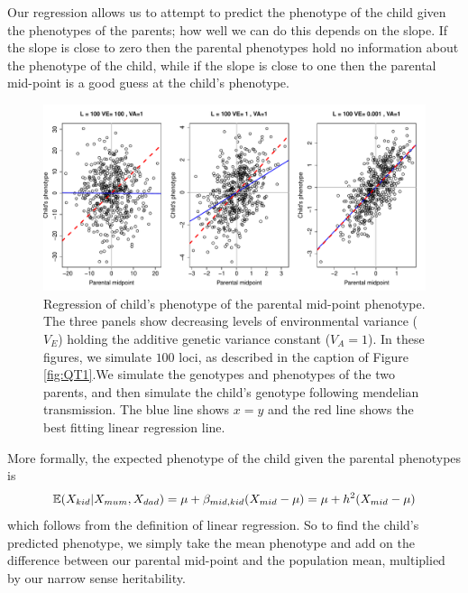 Our regression allows us to attempt to predict the phenotype of the
child given the phenotypes of the parents; how well we can do this depends on the
slope. If the slope is close to zero then the parental phenotypes hold no
information about the phenotype of the child, while if the slope is
close to one then the parental mid-point is a good guess at the child's
phenotype.\\
\begin{figure}
\begin{center}
\includegraphics[width=\textwidth]{figures/QT2.pdf}
\end{center}
\caption{Regression of child's phenotype of the parental mid-point phenotype. The three panels show decreasing levels of environmental
  variance ($V_E$) holding the additive genetic variance constant ($V_A=1$). 
 In these figures, we simulate $100$ loci, as described in
 the caption of Figure \ref{fig:QT1}.We simulate the genotypes and
 phenotypes of the two parents, and then simulate the child's genotype
following mendelian transmission. The blue line shows $x=y$ and the red
line shows the best fitting linear regression line.  }
\end{figure}

More formally, the expected phenotype of the child given the parental
phenotypes is
\begin{equation}
\mathbb{E}(X_{kid} | X_{mum},X_{dad}) = \mu +
\beta_{mid,kid}(X_{mid} - \mu) =\mu + h^2(X_{mid} - \mu)  \label{predict_kid}
\end{equation}
which follows from the definition of linear regression. So to find the
child's predicted phenotype, we simply take the mean phenotype and add on the difference between our parental mid-point and the population mean, multiplied by our
narrow sense heritability. \\



